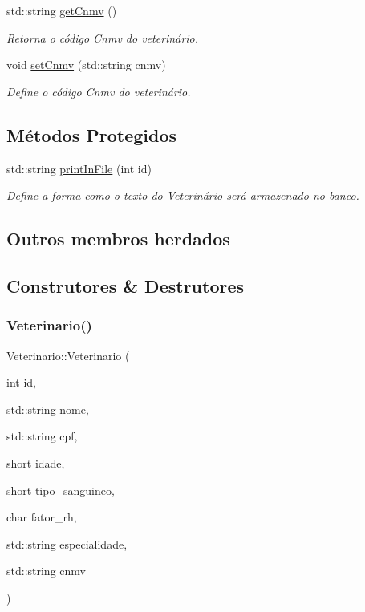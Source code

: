 \begin{DoxyCompactItemize}
std\+::string \hyperlink{classVeterinario_a48fd50544ed6af0b8c454b8f6cb812c0}{get\+Cnmv} ()
\begin{DoxyCompactList}\small\item\em Retorna o código Cnmv do veterinário. \end{DoxyCompactList}\item 
void \hyperlink{classVeterinario_a7c1e4210f1f1be4c2c45e0d16afb2e63}{set\+Cnmv} (std\+::string cnmv)
\begin{DoxyCompactList}\small\item\em Define o código Cnmv do veterinário. \end{DoxyCompactList}\end{DoxyCompactItemize}
\subsection*{Métodos Protegidos}
\begin{DoxyCompactItemize}
\item 
std\+::string \hyperlink{classVeterinario_a9c922980caf0113e0e9048ea3528e88d}{print\+In\+File} (int id)
\begin{DoxyCompactList}\small\item\em Define a forma como o texto do Veterinário será armazenado no banco. \end{DoxyCompactList}\end{DoxyCompactItemize}
\subsection*{Outros membros herdados}


\subsection{Construtores \& Destrutores}
\mbox{\label{classVeterinario_aff0d07b973488e857d796c98adf9969a}} 
\subsubsection{\texorpdfstring{Veterinario()}{Veterinario()}\hspace{0.1cm}{\footnotesize\ttfamily [1/2]}}
{\footnotesize\ttfamily Veterinario\+::\+Veterinario (\begin{DoxyParamCaption}\item[{int}]{id,  }\item[{std\+::string}]{nome,  }\item[{std\+::string}]{cpf,  }\item[{short}]{idade,  }\item[{short}]{tipo\+\_\+sanguineo,  }\item[{char}]{fator\+\_\+rh,  }\item[{std\+::string}]{especialidade,  }\item[{std\+::string}]{cnmv }\end{DoxyParamCaption})}



